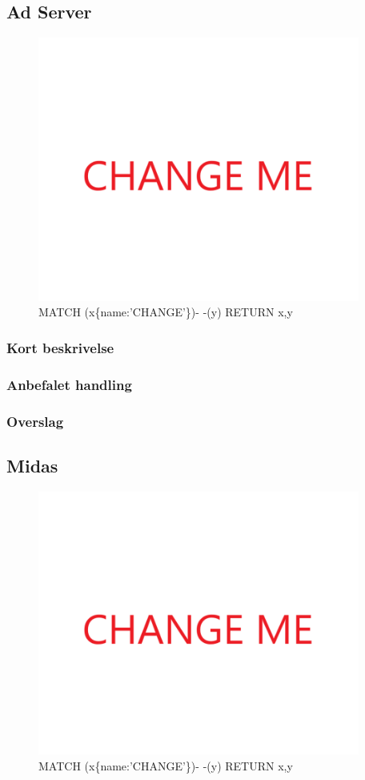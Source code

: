 \documentclass{article}
\begin{document}
\subsection{Ad Server}
\begin{figure}[h]
\includegraphics[width=300pt]{CHANGE.PNG}
\caption{MATCH (x\{name:'CHANGE'\})- -(y) RETURN x,y}
\end{figure}
\subsubsection{Kort beskrivelse}
\subsubsection{Anbefalet handling}
\subsubsection{Overslag}


\subsection{Midas}
\begin{figure}[h]
\includegraphics[width=300pt]{CHANGE.PNG}
\caption{MATCH (x\{name:'CHANGE'\})- -(y) RETURN x,y}
\end{figure}
\end{document}

